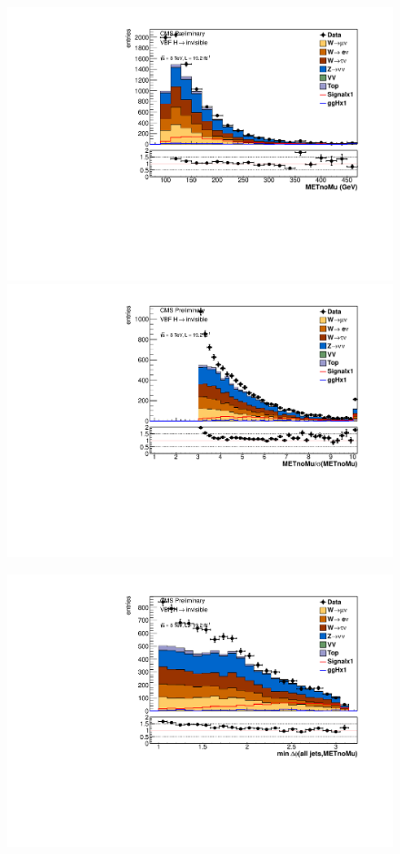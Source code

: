 \begin{figure}
    \includegraphics[width=.6\largefigwidth]{plots/parked/AN-14-243-figs/output_presel/nunu_metnomuons.pdf}
    \includegraphics[width=.6\largefigwidth]{plots/parked/AN-14-243-figs/output_presel/nunu_metnomu_significance.pdf}

    \includegraphics[width=.6\largefigwidth]{plots/parked/AN-14-243-figs/output_presel/nunu_alljetsmetnomu_mindphi.pdf}


\end{figure}
